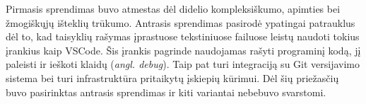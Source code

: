 \begin{activities}
{        Pirmasis sprendimas buvo atmestas dėl didelio kompleksiškumo, apimties bei žmogiškųjų išteklių trūkumo. Antrasis sprendimas pasirodė ypatingai patrauklus dėl to, kad taisyklių rašymas įprastuose tekstiniuose failuose leistų naudoti tokius įrankius kaip VSCode. Šis įrankis pagrinde naudojamas rašyti programinį kodą, jį paleisti ir ieškoti klaidų (\textit{angl. debug}). Taip pat turi integraciją su Git versijavimo sistema bei turi infrastruktūra pritaikytų įskiepių kūrimui. Dėl šių priežasčių buvo pasirinktas antrasis sprendimas ir kiti variantai nebebuvo svarstomi.
    }
     \row

    \rezultatai{

    } \row


\end{activities}